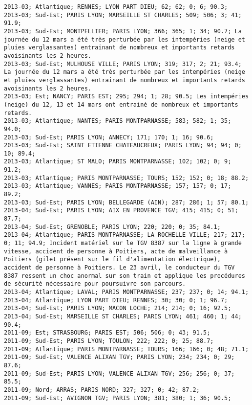 \documentclass{article}
\begin{document}
\begin{Verbatim}[commandchars=\\\{\}]
2013-03; Atlantique; RENNES; LYON PART DIEU; 62; 62; 0; 6; 90.3; 
2013-03; Sud-Est; PARIS LYON; MARSEILLE ST CHARLES; 509; 506; 3; 41; 91.9; 
2013-03; Sud-Est; MONTPELLIER; PARIS LYON; 366; 365; 1; 34; 90.7; La journée du 12 mars a été très perturbée par les intempéries (neige et pluies verglassantes) entrainant de nombreux et importants retards avoisinants les 2 heures.
2013-03; Sud-Est; MULHOUSE VILLE; PARIS LYON; 319; 317; 2; 21; 93.4; La journée du 12 mars a été très perturbée par les intempéries (neige et pluies verglassantes) entrainant de nombreux et importants retards avoisinants les 2 heures.
2013-03; Est; NANCY; PARIS EST; 295; 294; 1; 28; 90.5; Les intempéries (neige) du 12, 13 et 14 mars ont entrainé de nombreux et importants retards.
2013-03; Atlantique; NANTES; PARIS MONTPARNASSE; 583; 582; 1; 35; 94.0; 
2013-03; Sud-Est; PARIS LYON; ANNECY; 171; 170; 1; 16; 90.6; 
2013-03; Sud-Est; SAINT ETIENNE CHATEAUCREUX; PARIS LYON; 94; 94; 0; 10; 89.4; 
2013-03; Atlantique; ST MALO; PARIS MONTPARNASSE; 102; 102; 0; 9; 91.2; 
2013-03; Atlantique; PARIS MONTPARNASSE; TOURS; 152; 152; 0; 18; 88.2; 
2013-03; Atlantique; VANNES; PARIS MONTPARNASSE; 157; 157; 0; 17; 89.2; 
2013-03; Sud-Est; PARIS LYON; BELLEGARDE (AIN); 287; 286; 1; 57; 80.1; 
2013-04; Sud-Est; PARIS LYON; AIX EN PROVENCE TGV; 415; 415; 0; 51; 87.7; 
2013-04; Sud-Est; GRENOBLE; PARIS LYON; 220; 220; 0; 35; 84.1; 
2013-04; Atlantique; PARIS MONTPARNASSE; LA ROCHELLE VILLE; 217; 217; 0; 11; 94.9; Incident matériel sur le TGV 8387 sur la ligne à grande vitesse, accident de personne à Poitiers, acte de malveillance à Poitiers (gilet présent sur le fil d'alimentation électrique), accident de personne à Poitiers. Le 23 avril, le conducteur du TGV 8387 ressent un choc anormal sur son train et applique les procédures de sécurité nécessaire pour poursuivre son parcours.
2013-04; Atlantique; LAVAL; PARIS MONTPARNASSE; 237; 237; 0; 14; 94.1; 
2013-04; Atlantique; LYON PART DIEU; RENNES; 30; 30; 0; 1; 96.7; 
2013-04; Sud-Est; PARIS LYON; MACON LOCHE; 214; 214; 0; 16; 92.5; 
2013-04; Sud-Est; MARSEILLE ST CHARLES; PARIS LYON; 461; 460; 1; 44; 90.4; 
2011-09; Est; STRASBOURG; PARIS EST; 506; 506; 0; 43; 91.5; 
2011-09; Sud-Est; PARIS LYON; TOULON; 222; 222; 0; 25; 88.7; 
2011-09; Atlantique; PARIS MONTPARNASSE; TOURS; 166; 166; 0; 48; 71.1; 
2011-09; Sud-Est; VALENCE ALIXAN TGV; PARIS LYON; 234; 234; 0; 29; 87.6; 
2011-09; Sud-Est; PARIS LYON; VALENCE ALIXAN TGV; 256; 256; 0; 37; 85.5; 
2011-09; Nord; ARRAS; PARIS NORD; 327; 327; 0; 42; 87.2; 
2011-09; Sud-Est; AVIGNON TGV; PARIS LYON; 381; 380; 1; 36; 90.5; 

\end{Verbatim}
\end{document}
